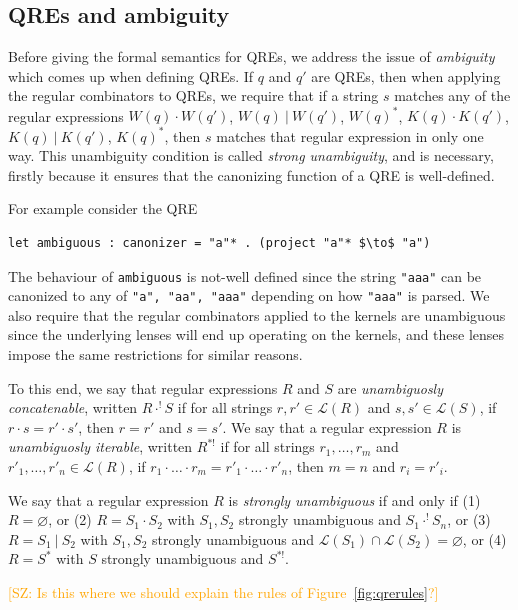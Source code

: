 \documentclass{svproc}
\newcommand{\cd}[1]{\lstinline[backgroundcolor=\color{white}]$#1$}
\newcommand{\FINISH}[3]{\ifdraft\textcolor{#1}{[#2: #3]}\fi}
\newcommand{\saz}[1]{\FINISH{orange}{SZ}{#1}}
\newcommand{\sep}{\ensuremath{\ | \ }}
\begin{document}
\subsection{QREs and ambiguity}
Before giving the formal semantics for QREs, we address the issue of {\em
ambiguity} which comes up when defining QREs. If $q$ and  $q'$ are QREs, then
when applying the regular combinators to QREs, we require that if a string $s$
matches any of the regular expressions $W(q) \cdot W(q')$, $W(q) \sep W(q')$,
$W(q)^*$, $K(q) \cdot K(q')$, $K(q) \sep K(q')$, $K(q)^*$, then $s$ matches
that regular expression in only one way. This unambiguity condition is called
{\em strong unambiguity}, and is necessary, firstly because it ensures that the
canonizing function of a QRE is well-defined.

For example consider the QRE

\begin{lstlisting}
let ambiguous : canonizer = "a"* . (project "a"* $\to$ "a")
\end{lstlisting}

\noindent The behaviour of \cd{ambiguous} is not-well defined since the string
\cd{"aaa"} can be canonized to any of \cd{"a", "aa", "aaa"} depending on how
\cd{"aaa"} is parsed. We also require that the regular combinators applied to
the kernels are unambiguous since the underlying lenses will end up operating
on the kernels, and these lenses impose the same restrictions for similar
reasons.

To this end, we say that regular expressions $R$ and $S$ are
\textit{unambiguosly concatenable}, written $R \cdot^! S$ if for all strings
$r, r' \in \mathcal{L}(R)$ and $s, s' \in \mathcal{L}(S)$, if $r \cdot s = r'
\cdot s'$, then $r = r'$ and $s = s'$. We say that a regular expression $R$ is
\textit{unambiguosly iterable}, written $R^{*!}$ if for all strings $r_1,
\ldots, r_m$ and $r'_1, \ldots, r'_n \in \mathcal{L}(R)$, if $r_1 \cdot \ldots
\cdot r_m = r'_1 \cdot \ldots \cdot r'_n$, then $m = n$ and $r_i = r'_i$.

We say that a regular expression $R$ is \textit{strongly unambiguous} if and
only if (1) $R = \varnothing$, or (2) $R = S_1 \cdot S_2$ with $S_1, S_2$
strongly unambiguous and $S_1 \cdot^! S_n$, or (3) $R = S_1 \sep S_2$ with
$S_1, S_2$ strongly unambiguous and $\mathcal{L}(S_1) \cap \mathcal{L}(S_2) =
\varnothing$, or (4) $R = S^*$ with $S$ strongly unambiguous and $S^{*!}$.

\saz{Is this where we should explain the rules of  Figure~\ref{fig:qrerules}?}
\end{document}
